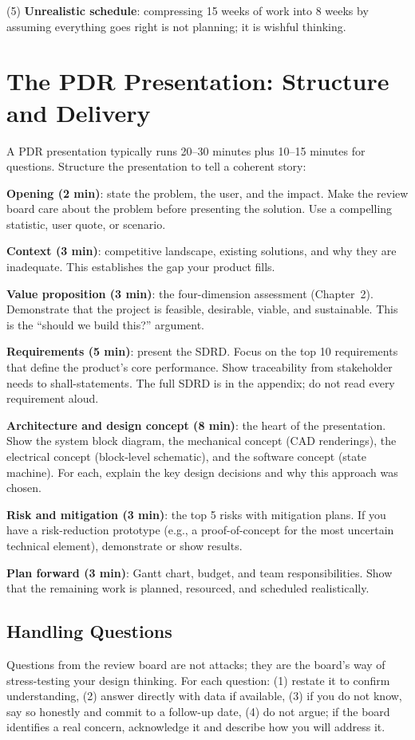 (5) \textbf{Unrealistic schedule}: compressing 15 weeks of work into 8 weeks by assuming everything goes right is not planning; it is wishful thinking.
\section{The PDR Presentation: Structure and Delivery}
A PDR presentation typically runs 20--30 minutes plus 10--15 minutes for questions. Structure the presentation to tell a coherent story:

\textbf{Opening (2 min)}: state the problem, the user, and the impact. Make the review board care about the problem before presenting the solution. Use a compelling statistic, user quote, or scenario.

\textbf{Context (3 min)}: competitive landscape, existing solutions, and why they are inadequate. This establishes the gap your product fills.

\textbf{Value proposition (3 min)}: the four-dimension assessment (Chapter~2). Demonstrate that the project is feasible, desirable, viable, and sustainable. This is the ``should we build this?'' argument.

\textbf{Requirements (5 min)}: present the SDRD. Focus on the top 10 requirements that define the product's core performance. Show traceability from stakeholder needs to shall-statements. The full SDRD is in the appendix; do not read every requirement aloud.

\textbf{Architecture and design concept (8 min)}: the heart of the presentation. Show the system block diagram, the mechanical concept (CAD renderings), the electrical concept (block-level schematic), and the software concept (state machine). For each, explain the key design decisions and why this approach was chosen.

\textbf{Risk and mitigation (3 min)}: the top 5 risks with mitigation plans. If you have a risk-reduction prototype (e.g., a proof-of-concept for the most uncertain technical element), demonstrate or show results.

\textbf{Plan forward (3 min)}: Gantt chart, budget, and team responsibilities. Show that the remaining work is planned, resourced, and scheduled realistically.

\subsection{Handling Questions}
Questions from the review board are not attacks; they are the board's way of stress-testing your design thinking. For each question: (1) restate it to confirm understanding, (2) answer directly with data if available, (3) if you do not know, say so honestly and commit to a follow-up date, (4) do not argue; if the board identifies a real concern, acknowledge it and describe how you will address it.

